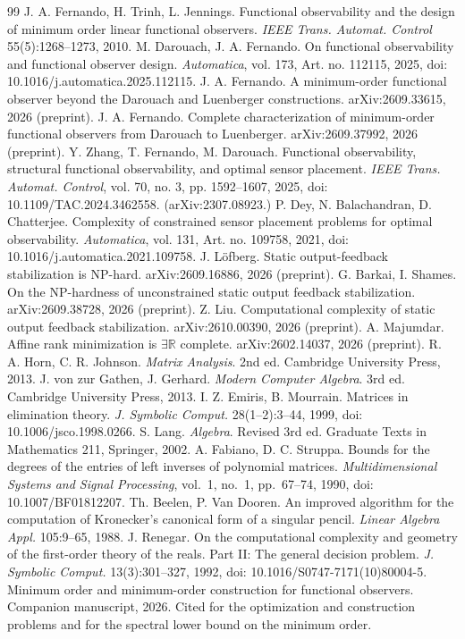 \documentclass[journal]{IEEEtran}
\theoremstyle{plainn}
\theoremstyle{remark}
\begin{document}
\begin{thebibliography}{99}
 J. A. Fernando, H. Trinh, L. Jennings. Functional observability and the design of minimum order linear functional observers. \emph{IEEE Trans. Automat. Control} 55(5):1268--1273, 2010.
 M. Darouach, J. A. Fernando. On functional observability and functional observer design. \emph{Automatica}, vol. 173, Art. no. 112115, 2025, doi: 10.1016/j.automatica.2025.112115.
 J. A. Fernando. A minimum-order functional observer beyond the Darouach and Luenberger constructions. arXiv:2609.33615, 2026 (preprint).
 J. A. Fernando. Complete characterization of minimum-order functional observers from Darouach to Luenberger. arXiv:2609.37992, 2026 (preprint).
 Y. Zhang, T. Fernando, M. Darouach. Functional
  observability, structural functional observability, and optimal sensor
  placement. \emph{IEEE Trans. Automat. Control}, vol. 70, no. 3,
  pp. 1592--1607, 2025, doi: 10.1109/TAC.2024.3462558.
  (arXiv:2307.08923.)
 P. Dey, N. Balachandran, D. Chatterjee. Complexity of
  constrained sensor placement problems for optimal observability.
  \emph{Automatica}, vol. 131, Art. no. 109758, 2021,
  doi: 10.1016/j.automatica.2021.109758.
 J. L\"{o}fberg. Static output-feedback stabilization is
  NP-hard. arXiv:2609.16886, 2026 (preprint).
 G. Barkai, I. Shames. On the NP-hardness of unconstrained
  static output feedback stabilization. arXiv:2609.38728, 2026 (preprint).
 Z. Liu. Computational complexity of static output feedback
  stabilization. arXiv:2610.00390, 2026 (preprint).
 A. Majumdar. Affine rank minimization is
  $\exists\mathbb R$ complete. arXiv:2602.14037, 2026 (preprint).
 R. A. Horn, C. R. Johnson. \emph{Matrix Analysis}. 2nd ed.
Cambridge University Press, 2013.
 J. von zur Gathen, J. Gerhard. \emph{Modern Computer Algebra}.
3rd ed. Cambridge University Press, 2013.
 I. Z. Emiris, B. Mourrain. Matrices in elimination theory. \emph{J. Symbolic Comput.} 28(1--2):3--44, 1999, doi: 10.1006/jsco.1998.0266.
 S. Lang. \emph{Algebra}. Revised 3rd ed.
Graduate Texts in Mathematics 211, Springer, 2002.
 A. Fabiano, D. C. Struppa. Bounds for the degrees of the entries of left
inverses of polynomial matrices. \emph{Multidimensional Systems and Signal Processing},
vol.~1, no.~1, pp.~67--74, 1990, doi: 10.1007/BF01812207.
 Th. Beelen, P. Van Dooren. An improved algorithm for the computation of Kronecker's canonical form of a singular pencil. \emph{Linear Algebra Appl.} 105:9--65, 1988.
 J. Renegar. On the computational complexity and geometry of the first-order theory of the reals. Part II: The general decision problem. \emph{J. Symbolic Comput.} 13(3):301--327, 1992, doi: 10.1016/S0747-7171(10)80004-5.
 Minimum order and minimum-order construction for functional observers.
Companion manuscript, 2026. Cited for the optimization and construction problems and for the
spectral lower bound on the minimum order.
\end{thebibliography}
\end{document}
